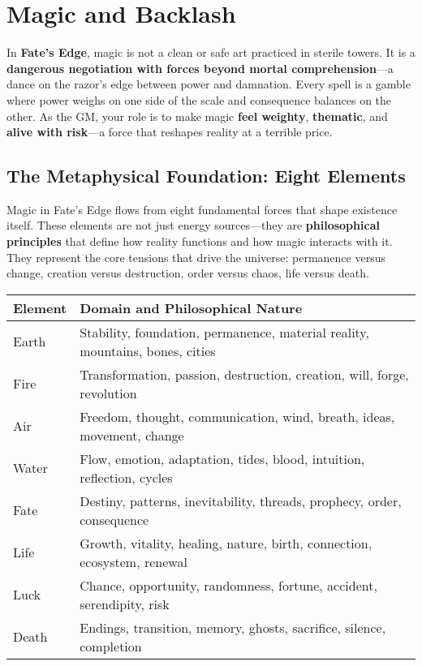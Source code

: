 \chapter{Magic and Backlash}

In \textbf{Fate's Edge}, magic is not a clean or safe art practiced in sterile towers. It is a \textbf{dangerous negotiation with forces beyond mortal comprehension}—a dance on the razor's edge between power and damnation. Every spell is a gamble where power weighs on one side of the scale and consequence balances on the other. As the GM, your role is to make magic \textbf{feel weighty}, \textbf{thematic}, and \textbf{alive with risk}—a force that reshapes reality at a terrible price.

\section*{The Metaphysical Foundation: Eight Elements}

Magic in Fate's Edge flows from eight fundamental forces that shape existence itself. These elements are not just energy sources—they are \textbf{philosophical principles} that define how reality functions and how magic interacts with it. They represent the core tensions that drive the universe: permanence versus change, creation versus destruction, order versus chaos, life versus death.

\begin{fatebox}
\begin{tabularx}{\textwidth}{lX}
\toprule
\textbf{Element} & \textbf{Domain and Philosophical Nature} \\
\midrule
Earth & Stability, foundation, permanence, material reality, mountains, bones, cities \\
Fire & Transformation, passion, destruction, creation, will, forge, revolution \\
Air & Freedom, thought, communication, wind, breath, ideas, movement, change \\
Water & Flow, emotion, adaptation, tides, blood, intuition, reflection, cycles \\
Fate & Destiny, patterns, inevitability, threads, prophecy, order, consequence \\
Life & Growth, vitality, healing, nature, birth, connection, ecosystem, renewal \\
Luck & Chance, opportunity, randomness, fortune, accident, serendipity, risk \\
Death & Endings, transition, memory, ghosts, sacrifice, silence, completion \\
\bottomrule
\end{tabularx}
\end{fatebox}

